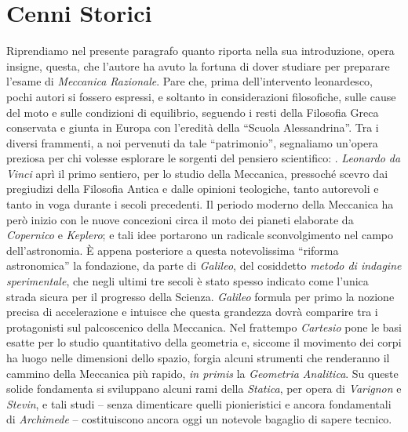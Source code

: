 \section{Cenni Storici}
Riprendiamo nel presente paragrafo quanto riporta \cite{finzi} nella sua introduzione, opera
insigne, questa, che l'autore ha avuto la fortuna di dover studiare per
preparare l'esame di {\em Meccanica Razionale}.
Pare che, prima dell'intervento leonardesco, pochi autori si fossero espressi,
e soltanto in considerazioni filosofiche, sulle cause del moto e sulle condizioni di
equilibrio, seguendo i resti della Filosofia Greca conservata e giunta in Europa
con l'eredit\`a della ``Scuola Alessandrina''. Tra i diversi
frammenti, a noi pervenuti da tale ``patrimonio'', segnaliamo
un'opera preziosa per chi volesse esplorare le sorgenti del
pensiero scientifico: \cite{aristotele}.
{\em Leonardo da Vinci} apr\`i il primo sentiero, per lo studio della Meccanica,
pressoch\'e scevro 
dai pregiudizi della Filosofia Antica e dalle opinioni teologiche, tanto autorevoli
e tanto in voga durante i secoli precedenti.
Il periodo moderno della Meccanica ha per\`o inizio con le nuove concezioni 
circa il moto dei pianeti elaborate da {\em Copernico} e {\em Keplero}; 
e tali idee
portarono un radicale sconvolgimento nel campo dell'astronomia.
\`E appena posteriore a questa notevolissima ``riforma astronomica'' la fondazione,
da parte di {\em Galileo}, 
del cosiddetto {\em metodo di indagine sperimentale}, che
negli ultimi tre secoli \`e stato spesso indicato come l'unica strada
sicura per il progresso della Scienza.
{\em Galileo} formula per primo la nozione precisa di
accelerazione e intuisce che questa grandezza dovr\`a comparire tra i protagonisti sul
palcoscenico della Meccanica. Nel frattempo {\em Cartesio} pone le basi
esatte per lo studio quantitativo della geometria e, siccome il
movimento dei corpi ha luogo
nelle dimensioni dello spazio, forgia alcuni strumenti
che renderanno il cammino della Meccanica pi\`u rapido,
 {\em in primis} la
{\em Geometria Analitica}.
Su queste solide fondamenta si sviluppano alcuni rami della {\em Statica},  
per opera di {\em Varignon} e {\em Stevin},
e tali studi -- senza dimenticare quelli pionieristici e ancora fondamentali
di {\em Archimede} -- costituiscono ancora oggi un notevole bagaglio di sapere tecnico.
